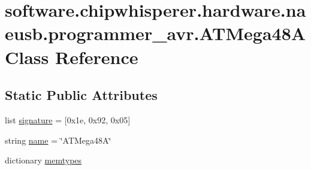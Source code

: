 \hypertarget{classsoftware_1_1chipwhisperer_1_1hardware_1_1naeusb_1_1programmer__avr_1_1ATMega48A}{}\section{software.\+chipwhisperer.\+hardware.\+naeusb.\+programmer\+\_\+avr.\+A\+T\+Mega48\+A Class Reference}
\label{classsoftware_1_1chipwhisperer_1_1hardware_1_1naeusb_1_1programmer__avr_1_1ATMega48A}
\subsection*{Static Public Attributes}
\begin{DoxyCompactItemize}
\item 
list \hyperlink{classsoftware_1_1chipwhisperer_1_1hardware_1_1naeusb_1_1programmer__avr_1_1ATMega48A_a73f9271d45e7959dc26f0099f160b0d3}{signature} = \mbox{[}0x1e, 0x92, 0x05\mbox{]}
\item 
string \hyperlink{classsoftware_1_1chipwhisperer_1_1hardware_1_1naeusb_1_1programmer__avr_1_1ATMega48A_a16da8f2833e6e1d9ebad428fce62f25f}{name} = \char`\"{}A\+T\+Mega48\+A\char`\"{}
\item 
dictionary \hyperlink{classsoftware_1_1chipwhisperer_1_1hardware_1_1naeusb_1_1programmer__avr_1_1ATMega48A_adf66119411968536a27291e2a671b7d0}{memtypes}
\end{DoxyCompactItemize}


